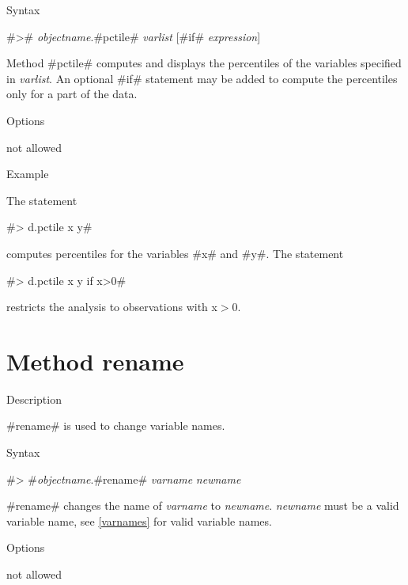 \begin{stanza}{Syntax}

#># {\em objectname}.#pctile# {\em varlist} [#if# {\em
expression}]

Method #pctile# computes and displays the percentiles of the
variables specified in {\em varlist}. An optional #if# statement
may be added to compute the percentiles only for a part of the
data.
\end{stanza}

\begin{stanza}{Options}

not allowed
\end{stanza}


\begin{stanza}{Example}

The statement

#> d.pctile x y#

computes percentiles for the variables #x# and #y#.
The statement

#> d.pctile x y if x>0#

restricts the analysis to observations with x$>$0.
\end{stanza}



\clearpage



\section{Method rename}
 


\label{rename}


\begin{stanza}{Description}

#rename# is used to change variable names.
\end{stanza}


\begin{stanza}{Syntax}

#> #{\em objectname}.#rename# {\em varname} {\em newname}

#rename# changes the name of {\em varname} to {\em newname}. {\em
newname} must be a valid variable name, see \autoref{varnames} for
valid variable names.
\end{stanza}

\begin{stanza}{Options}

not allowed

\end{stanza}

